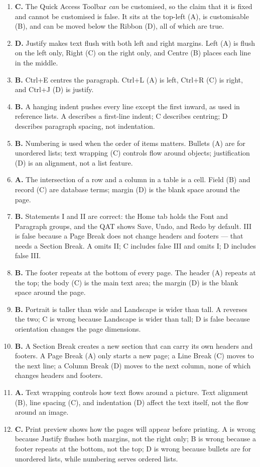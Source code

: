 \begin{enumerate}[label=\textbf{Q\arabic*.}, leftmargin=*]
  (B) centres text; Ctrl+Enter (D) inserts a page break.
\item \textbf{C.} The Quick Access Toolbar \emph{can} be customised, so the
  claim that it is fixed and cannot be customised is false. It sits at the
  top-left (A), is customisable (B), and can be moved below the Ribbon (D),
  all of which are true.
\item \textbf{D.} Justify makes text flush with both left and right margins.
  Left (A) is flush on the left only, Right (C) on the right only, and
  Centre (B) places each line in the middle.
\item \textbf{B.} Ctrl+E centres the paragraph. Ctrl+L (A) is left, Ctrl+R
  (C) is right, and Ctrl+J (D) is justify.
\item \textbf{B.} A hanging indent pushes every line except the first inward,
  as used in reference lists. A describes a first-line indent; C describes
  centring; D describes paragraph spacing, not indentation.
\item \textbf{B.} Numbering is used when the order of items matters. Bullets
  (A) are for unordered lists; text wrapping (C) controls flow around
  objects; justification (D) is an alignment, not a list feature.
\item \textbf{A.} The intersection of a row and a column in a table is a
  cell. Field (B) and record (C) are database terms; margin (D) is the blank
  space around the page.
\item \textbf{B.} Statements I and II are correct: the Home tab holds the
  Font and Paragraph groups, and the QAT shows Save, Undo, and Redo by
  default. III is false because a Page Break does not change headers and
  footers --- that needs a Section Break. A omits II; C includes false III
  and omits I; D includes false III.
\item \textbf{B.} The footer repeats at the bottom of every page. The header
  (A) repeats at the top; the body (C) is the main text area; the margin (D)
  is the blank space around the page.
\item \textbf{B.} Portrait is taller than wide and Landscape is wider than
  tall. A reverses the two; C is wrong because Landscape is wider than tall;
  D is false because orientation changes the page dimensions.
\item \textbf{B.} A Section Break creates a new section that can carry its
  own headers and footers. A Page Break (A) only starts a new page; a Line
  Break (C) moves to the next line; a Column Break (D) moves to the next
  column, none of which changes headers and footers.
\item \textbf{A.} Text wrapping controls how text flows around a picture.
  Text alignment (B), line spacing (C), and indentation (D) affect the text
  itself, not the flow around an image.
\item \textbf{C.} Print preview shows how the pages will appear before
  printing. A is wrong because Justify flushes both margins, not the right
  only; B is wrong because a footer repeats at the bottom, not the top; D is
  wrong because bullets are for unordered lists, while numbering serves
  ordered lists.


\end{enumerate}
